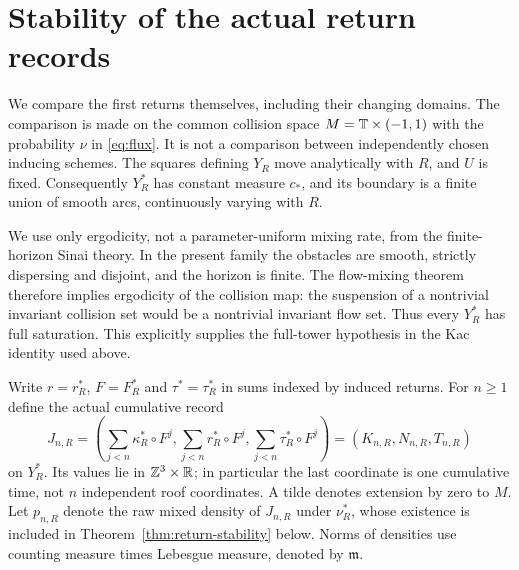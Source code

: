 \section{Stability of the actual return records}
\label{sec:return-stability}
We compare the first returns themselves, including their changing domains.
The comparison is made on the common collision space
$M=\mathbb T\times(-1,1)$ with the probability $\nu$ in \eqref{eq:flux}.
It is not a comparison between independently chosen inducing schemes.
The squares defining $Y_R$ move analytically with $R$, and $U$ is fixed.
Consequently $Y_R^*$ has constant measure $c_*$, and its boundary is a
finite union of smooth arcs, continuously varying with $R$.

We use only ergodicity, not a parameter-uniform mixing rate, from the
finite-horizon Sinai theory. In the present family the obstacles are
smooth, strictly dispersing and disjoint, and the horizon is finite.
The flow-mixing theorem \cite[Corollary 1.3 and correction note]{BDL}
therefore implies ergodicity of the collision map: the suspension of a
nontrivial invariant collision set would be a nontrivial invariant flow
set. Thus every $Y_R^*$ has full saturation. This explicitly supplies the
full-tower hypothesis in the Kac identity used above.

Write $r=r_R^*$, $F=F_R^*$ and $\tau^*=\tau_R^*$ in sums indexed by
induced returns. For $n\ge1$ define the actual cumulative record
\[
 J_{n,R}=\left(\sum_{j<n}\kappa_R^*\circ F^j,
                   \sum_{j<n}r_R^*\circ F^j,
                   \sum_{j<n}\tau_R^*\circ F^j\right)
       =(K_{n,R},N_{n,R},T_{n,R})
\]
on $Y_R^*$. Its values lie in $\mathbb Z^3\times\mathbb R$; in particular the last
coordinate is one cumulative time, not $n$ independent roof coordinates.
A tilde denotes extension by zero to $M$. Let $p_{n,R}$ denote the raw
mixed density of $J_{n,R}$ under $\nu_R^*$, whose existence is included
in Theorem~\ref{thm:return-stability} below. Norms of densities use
counting measure times Lebesgue measure, denoted by $\mathfrak m$.

